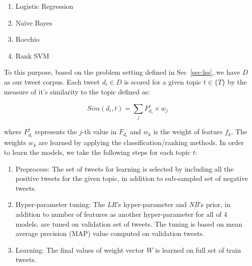 \begin{enumerate}
\item Logistic Regression
\item Na\"{i}ve Bayes
\item Rocchio %
\item Rank SVM
\end{enumerate}

To this purpose, based on the problem setting defined in Sec~\ref{sec:lss}, we have $D$ as our tweet corpus. Each tweet ${d_{i}} \in D$ is scored for a given topic ${t \in \{ T \}}$ by the measure of it's similarity to the topic defined as:

\begin{equation}
Sim({d_{i}}, t) = \sum_{j} F_{d_{i}}^{j} \times {w_{j}}
\label{eq:similarity}
\end{equation}

where $F_{d_{i}}^{j}$ represents the $j$-th value in $F_{d_{i}}$ and ${w_{k}}$ is the weight of feature ${f_{k}}$. The weights ${w_{k}}$ are learned by applying the classification/ranking methods.
In order to learn the models, we take the following steps for each topic $t$:
\begin{enumerate}
\item Preprocess: The set of tweets for learning is selected by including all the positive tweets for the given topic, in addition to sub-sampled set of negative tweets.
\item Hyper-parameter tuning: The \textit{LR}'s hyper-parameter and \textit{NB}'s prior, in addition to number of features as another hyper-parameter for all of $4$ models, are tuned on validation set of tweets. The tuning is based on mean average precision (MAP) value computed on validation tweets.
\item Learning: The final values of weight vector $W$ is learned on full set of train tweets.
\end{enumerate}

